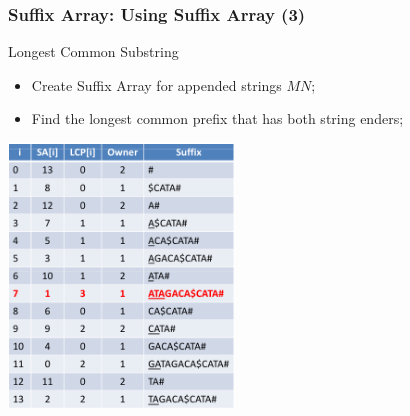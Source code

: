 \begin{frame}
    \frametitle{Suffix Array: Using Suffix Array (3)}
  {\smaller
    \begin{block}{Longest Common Substring}
      \begin{itemize}
      \item Create Suffix Array for appended strings $MN$;
      \item Find the longest common prefix that has both string enders;
      \end{itemize}
    \end{block}
    \begin{center}
      \includegraphics[width=0.45\textwidth]{../img/suffixarray3_halim}
    \end{center}
  }
\end{frame}
